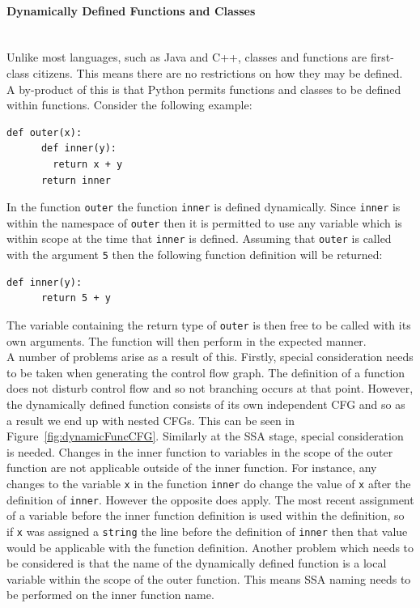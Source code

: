 \documentclass[12pt, titlepage]{article}
\begin{document}
\paragraph*{Dynamically Defined Functions and Classes} \mbox{} \\
Unlike most languages, such as Java and C++, classes and functions are first-class citizens. This means there are no restrictions on how they may be defined. A by-product of this is that Python permits functions and classes to be defined within functions. Consider the following example:
\begin{lstlisting}[mathescape]
    def outer(x):
      def inner(y):
        return x + y
      return inner
\end{lstlisting}
In the function \texttt{outer} the function \texttt{inner} is defined dynamically. Since \texttt{inner} is within the namespace of \texttt{outer} then it is permitted to use any variable which is within scope at the time that \texttt{inner} is defined. Assuming that \texttt{outer} is called with the argument \texttt{5} then the following function definition will be returned:
\begin{lstlisting}[mathescape]
    def inner(y):
      return 5 + y
\end{lstlisting}
The variable containing the return type of \texttt{outer} is then free to be called with its own arguments. The function will then perform in the expected manner. \\
\indent A number of problems arise as a result of this. Firstly, special consideration needs to be taken when generating the control flow graph. The definition of a function does not disturb control flow and so not branching occurs at that point. However, the dynamically defined function consists of its own independent CFG and so as a result we end up with nested CFGs. This can be seen in Figure~\ref{fig:dynamicFuncCFG}. Similarly at the SSA stage, special consideration is needed. Changes in the inner function to variables in the scope of the outer function are not applicable outside of the inner function. For instance, any changes to the variable \texttt{x} in the function \texttt{inner} do change the value of \texttt{x} after the definition of \texttt{inner}. However the opposite does apply. The most recent assignment of a variable before the inner function definition is used within the definition, so if \texttt{x} was assigned a \texttt{string} the line before the definition of \texttt{inner} then that value would be applicable with the function definition. Another problem which needs to be considered is that the name of the dynamically defined function is a local variable within the scope of the outer function. This means SSA naming needs to be performed on the inner function name. \\
\end{document}
